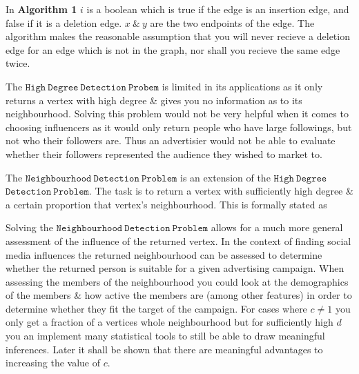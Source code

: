 \documentclass[11pt,twoside,a4paper]{report}
\begin{document}
In \textbf{Algorithm 1} $i$ is a boolean which is true if the edge is an insertion edge, and false if it is a deletion edge. $x\ \&\ y$ are the two endpoints of the edge. The algorithm makes the reasonable assumption that you will never recieve a deletion edge for an edge which is not in the graph, nor shall you recieve the same edge twice.
\par The $\mathtt{High\ Degree\ Detection\ Probem}$ is limited in its applications as it only returns a vertex with high degree \& gives you no information as to its neighbourhood. Solving this problem would not be very helpful when it comes to choosing influencers as it would only return people who have large followings, but not who their followers are. Thus an advertisier would not be able to evaluate whether their followers represented the audience they wished to market to.
\par The $\mathtt{Neighbourhood\ Detection\ Problem}$ is an extension of the $\mathtt{High\ Degree}$ $\mathtt{Detection\ Problem}$. The task is to return a vertex with sufficiently high degree \& a certain proportion that vertex's neighbourhood. This is formally stated as
\vspace{.3cm}\begin{adjustwidth}{.3cm}{}\end{adjustwidth}
\par Solving the $\mathtt{Neighbourhood\ Detection\ Problem}$ allows for a much more general assessment of the influence of the returned vertex. In the context of finding social media influences the returned neighbourhood can be assessed to determine whether the returned person is suitable for a given advertising campaign. When assessing the members of the neighbourhood you could look at the demographics of the members \& how active the members are (among other features) in order to determine whether they fit the target of the campaign. For cases where $c\neq 1$ you only get a fraction of a vertices whole neighbourhood but for sufficiently high $d$ you an implement many statistical tools to still be able to draw meaningful inferences. Later it shall be shown that there are meaningful advantages to increasing the value of $c$.
\end{document}
